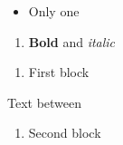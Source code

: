 \documentclass{article}
\begin{document}
\begin{enumerate}
\end{enumerate}

\begin{itemize}
\item Only one
\end{itemize}

\begin{enumerate}
\item \textbf{Bold} and \emph{italic}
\end{enumerate}

\begin{enumerate}
\item First block
\end{enumerate}
Text between
\begin{enumerate}[start=100]
\item Second block
\end{enumerate}
\end{document}
